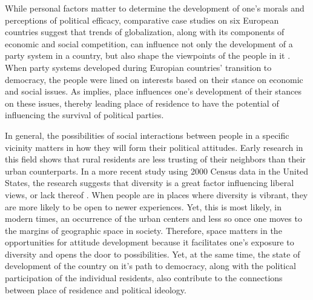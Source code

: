 \documentclass[12pt, titlepage]{article}
\begin{document}
While personal factors matter to determine the development of one's morals and perceptions of political efficacy, comparative case studies on six European countries suggest that trends of globalization, along with its components of economic and social competition, can influence not only the development of a party system in a country, but also shape the viewpoints of the people in it \citep{kriesi_globalization_2006}. When party systems developed during Europian countries' transition to democracy, the people were lined on interests based on their stance on economic and social issues. As \cite{walsh_putting_2012} implies, place influences one's development of their stances on these issues, thereby leading place of residence to have the potential of influencing the survival of political parties.

In general, the possibilities of social interactions between people in a specific vicinity matters in how they will form their political attitudes. Early research in this field \citep{glenn_rural-urban_1967} shows that rural residents are less trusting of their neighbors than their urban counterparts.  In a more recent study using 2000 Census data in the United States, the research suggests that diversity is a great factor influencing liberal views, or lack thereof \citep{williamson_sprawl_2008}. When people are in places where diversity is vibrant, they are more likely to be open to newer experiences. Yet, this is most likely, in modern times, an occurrence of the urban centers and less so once one moves to the margins of geographic space in society. Therefore, space matters in the opportunities for attitude development because it facilitates one's exposure to diversity and opens the door to possibilities. Yet, at the same time, the state of development of the country on it's path to democracy, along with the political participation of the individual residents, also contribute to the connections between place of residence and political ideology. 



\end{document}
